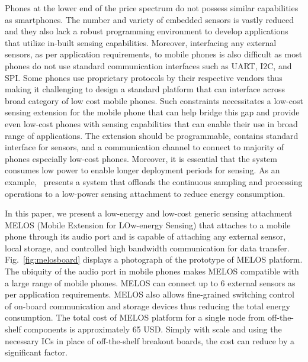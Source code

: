 \documentclass[10pt]{sigplan-proc-varsize}
\newcommand{\figref}[1]{Fig.~\ref{#1}}
\newcommand{\melos}{MELOS }
\begin{document}
Phones at the lower end of the price spectrum do not possess similar capabilities as smartphones. The number and variety of embedded sensors is vastly reduced and they also lack a robust programming environment to develop applications that utilize in-built sensing capabilities. Moreover, interfacing any external sensors, as per application requirements, to mobile phones is also difficult\cite{psi} as most phones do not use standard communication interfaces such as UART, I2C, and SPI. Some phones use proprietary protocols by their respective vendors thus making it challenging to design a standard platform that can interface across broad category of low cost mobile phones. Such constraints necessitates a low-cost sensing extension for the mobile phone that can help bridge this gap and provide even low-cost phones with sensing capabilities that can enable their use in broad range of applications. The extension should be programmable, contains standard interface for sensors, and a communication channel to connect to majority of phones especially low-cost phones. Moreover, it is essential that the system consumes low power to enable longer deployment periods for sensing. As an example,~\cite{littlerock} presents a system that offloads the continuous sampling and processing operations to a low-power sensing attachment to reduce energy consumption.

In this paper, we present a low-energy and low-cost generic sensing attachment \melos (Mobile Extension for LOw-energy Sensing) that attaches to a mobile phone through its audio port and is capable of attaching any external sensor, local storage, and controlled high bandwidth communication for data transfer. \figref{fig:melosboard} displays a photograph of the prototype of \melos platform. The ubiquity of the audio port in mobile phones makes \melos compatible with a large range of mobile phones. \melos can connect up to 6 external sensors as per application requirements. \melos also allows fine-grained switching control of on-board communication and storage devices thus reducing the total energy consumption. The total cost of \melos platform for a single node from off-the-shelf components is approximately 65 USD. Simply with scale and using the necessary ICs in place of off-the-shelf breakout boards, the cost can reduce by a significant factor. 

\end{document}
